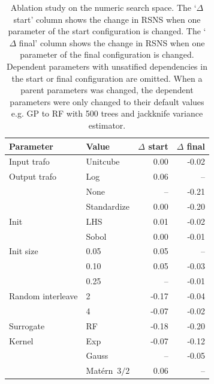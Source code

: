 \begin{table}[H]
  \centering
  \caption{Ablation study on the numeric search space.
    The `$\Delta$ start' column shows the change in RSNS when one parameter of the start configuration is changed.
    The `$\Delta$ final' column shows the change in RSNS when one parameter of the final configuration is changed.
    Dependent parameters with unsatified dependencies in the start or final configuration are omitted.
    When a parent parameters was changed, the dependent parameters were only changed to their default values e.g. GP to RF with 500 trees and jackknife variance estimator.
  }
  \label{tab:ablation-numeric}
  \begin{tabular}{llrr}
    \toprule
    Parameter            & Value       & $\Delta$ start & $\Delta$ final \\
    \midrule
    Input trafo          & Unitcube    & 0.00           & -0.02          \\
    Output trafo         & Log         & 0.06           & --             \\
                         & None        & --             & -0.21          \\
                         & Standardize & 0.00           & -0.20          \\
    Init                 & LHS         & 0.01           & -0.02          \\
                         & Sobol       & 0.00           & -0.01          \\
    Init size            & 0.05        & 0.05           & --             \\
                         & 0.10        & 0.05           & -0.03          \\
                         & 0.25        & --             & -0.01          \\
    Random interleave    & 2           & -0.17          & -0.04          \\
                         & 4           & -0.07          & -0.02          \\
    Surrogate            & RF          & -0.18          & -0.20          \\
    Kernel               & Exp         & -0.07          & -0.12          \\
                         & Gauss       & --             & -0.05          \\
                         & Matérn~$3/2$  & 0.06           & --             \\

\end{tabular}
\end{table}
